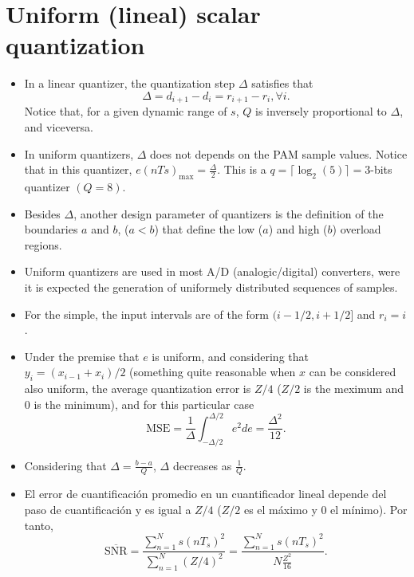 \section{Uniform (lineal) scalar quantization}
\begin{itemize}
\item
  In a linear
  quantizer, the quantization step \(\Delta\) satisfies that
  \begin{equation}
    \Delta=d_{i+1}-d_i=r_{i+1}-r_i, \forall i.
  \end{equation}
  Notice that, for a given dynamic range of \(s\), \(Q\) is inversely
  proportional to \(\Delta\), and viceversa.

\item
  In uniform quantizers, \(\Delta\) does not depends on the PAM sample
  values. Notice that in this quantizer,
  $e(nTs)_{\text{max}}=\frac{\Delta}{2}$.  This is a
  $q=\lceil\log_2(5)\rceil=3$-bits quantizer $(Q=8)$.

\item Besides $\Delta$, another design parameter of quantizers is the
  definition of the boundaries $a$ and $b$, ($a<b$) that define the
  low ($a$) and high ($b$) overload regions. %
  
\item
  Uniform quantizers are used in most A/D (analogic/digital)
  converters, were it is expected the generation of uniformely
  distributed sequences of samples.

\item
  For the simple, the input intervals are of the form $(i-1/2,i+1/2]$
    and $r_i=i$.

\item Under the premise that $e$ is uniform, and considering that
  $y_i=(x_{i-1}+x_i)/2$ (something quite reasonable when $x$ can be
  considered also uniform, the average quantization error is $Z/4$
  ($Z/2$ is the meximum and $0$ is the minimum), and for this
  particular case
  \begin{equation}
    \text{MSE} = \frac{1}{\Delta}\int_{-\Delta/2}^{\Delta/2}e^2de=\frac{\Delta^2}{12}.
  \end{equation}

\item Considering that $\Delta=\frac{b-a}{Q}$, $\Delta$ decreases as
  $\frac{1}{Q}$.

\item El error de cuantificaci\'on promedio en un cuantificador lineal
  depende del paso de cuantificaci\'on y es igual a $Z/4$ ($Z/2$ es el
  m\'aximo y $0$ el m\'inimo). Por tanto,
  \begin{equation*}
    \overline{\text{SNR}}=\frac{\displaystyle\sum_{n=1}^N
    s(nT_s)^2}{\displaystyle\sum_{n=1}^N (Z/4)^2} =
    \frac{\displaystyle\sum_{n=1}^N
      s(nT_s)^2}{N\displaystyle\frac{Z^2}{16}}.
  \end{equation*}


\end{itemize}
